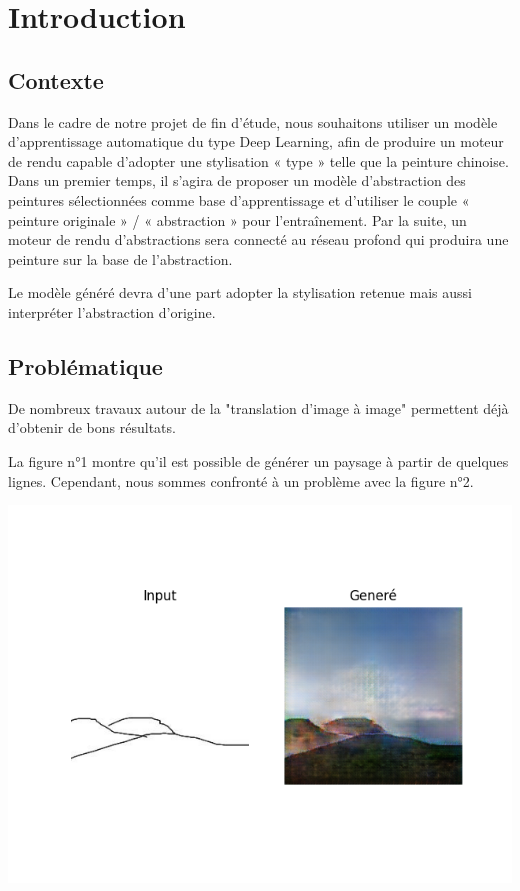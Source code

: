 \documentclass[a4paper, 12pt]{book}
\begin{document}
\mainmatter
\chapter*{Introduction}

\section{Contexte}
Dans le cadre de notre projet de fin d'étude, nous souhaitons utiliser un modèle d’apprentissage automatique du type Deep Learning, afin de produire un moteur de rendu capable d’adopter une stylisation « type » telle que la peinture chinoise. Dans un premier temps, il s’agira de proposer un modèle d’abstraction des peintures sélectionnées comme base d’apprentissage et d’utiliser le couple « peinture originale » / « abstraction » pour l’entraînement. Par la suite, un moteur de rendu d’abstractions sera connecté au réseau profond qui produira une peinture sur la base de l’abstraction.

Le modèle généré devra d'une part adopter la stylisation retenue mais aussi interpréter l'abstraction d'origine.

\section{Problématique}

De nombreux travaux autour de la "translation d'image à image" \cite{DBLP:journals/corr/IsolaZZE16} permettent déjà d'obtenir de bons résultats.

La figure n°1 montre qu'il est possible de générer un paysage à partir de quelques lignes. Cependant, nous sommes confronté à un problème avec la figure n°2.

\begin{center}
\includegraphics[scale=0.5]{images/pix2pix-t1.png}
\label{fig1}
\end{center}
\end{document}
